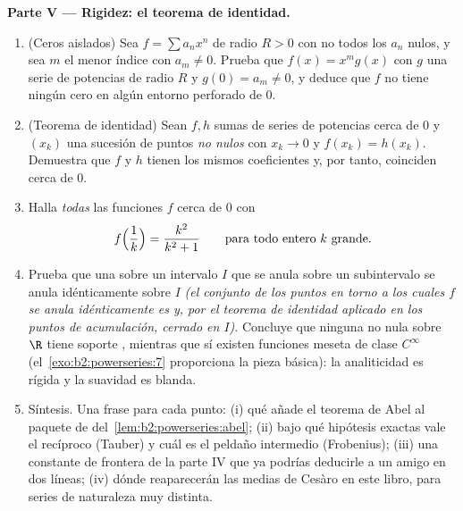 \begin{problem}
\medskip
\noindent\textbf{Parte V --- Rigidez: el teorema de identidad.}
\begin{enumerate}[resume]
  \item (Ceros aislados) Sea $f = \sum a_nx^n$ de radio $R > 0$ con
        no todos los $a_n$ nulos, y sea $m$ el menor índice con
        $a_m \neq 0$. Prueba que $f(x) = x^m g(x)$ con $g$ una serie
        de potencias de radio $R$ y $g(0) = a_m \neq 0$, y deduce
        que $f$ no tiene ningún cero en algún entorno perforado de
        $0$.
  \item (Teorema de identidad) Sean $f, h$ sumas de series de
        potencias cerca de $0$ y $(x_k)$ una sucesión de puntos
        \emph{no nulos} con $x_k \to 0$ y $f(x_k) = h(x_k)$.
        Demuestra que $f$ y $h$ tienen los mismos coeficientes y,
        por tanto, coinciden cerca de $0$.
  \item Halla \emph{todas} las funciones $f$  cerca de
        $0$ con
        \[
        f\Bigl(\frac1k\Bigr) = \frac{k^2}{k^2+1}
        \qquad\text{para todo entero } k \text{ grande.}
        \]
  \item Prueba que una  sobre un intervalo
         $I$ que se anula sobre un subintervalo se anula
        idénticamente sobre $I$ \emph{(el conjunto de los puntos en
        torno a los cuales $f$ se anula idénticamente es  y,
        por el teorema de identidad aplicado en los puntos de
        acumulación, cerrado en $I$)}. Concluye que ninguna
         no nula sobre $\R$ tiene soporte
        , mientras que sí existen funciones meseta de clase
        $C^\infty$ (el~\cref{exo:b2:powerseries:7} proporciona la
        pieza básica): la analiticidad es rígida y la suavidad es
        blanda.
  \item Síntesis. Una frase para cada punto: (i) qué añade el
        teorema de Abel al paquete de  del~\cref{lem:b2:powerseries:abel}; (ii) bajo qué hipótesis
        exactas vale el recíproco (Tauber) y cuál es el peldaño
        intermedio (Frobenius); (iii) una constante de frontera de
        la parte IV que ya podrías deducirle a un amigo en dos
        líneas; (iv) dónde reaparecerán las medias de Cesàro en este
        libro, para series de naturaleza muy distinta.
\end{enumerate}
\end{problem}
